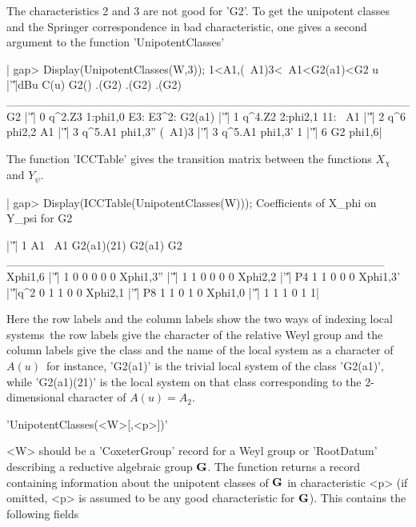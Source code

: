 The  characteristics 2 and  3 are not  good for 'G2'.  To get the unipotent
classes  and the Springer correspondence in bad characteristic, one gives a
second argument to the function 'UnipotentClasses'\:

|    gap> Display(UnipotentClasses(W,3));
    1<A1,(~A1)3<~A1<G2(a1)<G2
         u |'\|'|dBu       C(u)       G2() .(G2) .(G2) .(G2)
    ________________________________________________
    G2     |'\|'|  0 q^2.Z3 1:phi{1,0}         E3: E3^2:
    G2(a1) |'\|'|  1 q^4.Z2 2:phi{2,1}   11:            
    ~A1    |'\|'|  2    q^6   phi{2,2}                  
    A1     |'\|'|  3 q^5.A1 phi{1,3}''                  
    (~A1)3 |'\|'|  3 q^5.A1  phi{1,3}'                  
    1      |'\|'|  6     G2   phi{1,6}|

The  function 'ICCTable' gives the  transition matrix between the functions
$X_\chi$  and $Y_\psi$.

|    gap> Display(ICCTable(UnipotentClasses(W)));
    Coefficients of X_phi on Y_psi for G2
    
                |'\|'|  1 A1 ~A1 G2(a1)(21) G2(a1) G2
    _____________________________________________
    Xphi{1,6}   |'\|'|  1  0   0          0      0  0
    Xphi{1,3}'' |'\|'|  1  1   0          0      0  0
    Xphi{2,2}   |'\|'| P4  1   1          0      0  0
    Xphi{1,3}'  |'\|'|q^2  0   1          1      0  0
    Xphi{2,1}   |'\|'| P8  1   1          0      1  0
    Xphi{1,0}   |'\|'|  1  1   1          0      1  1|

Here  the row labels  and the column  labels show the  two ways of indexing
local  systems\:\ the  row labels  give the  character of the relative Weyl
group and the column labels give the class and the name of the local system
as  a character  of $A(u)$\:\  for instance,  'G2(a1)' is the trivial local
system  of the  class 'G2(a1)',  while 'G2(a1)(21)'  is the local system on
that class corresponding to the 2-dimensional character of $A(u)=A_2$.


'UnipotentClasses(<W>[,<p>])'

<W>  should  be  a  'CoxeterGroup'  record  for a Weyl group or 'RootDatum'
describing a reductive algebraic group ${\bf G}$. The function returns a record
containing   information   about   the   unipotent   classes  of  ${\bf G}$  in
characteristic   <p>  (if   omitted,  <p>   is  assumed   to  be  any  good
characteristic for ${\bf G}$). This contains the following fields\:

